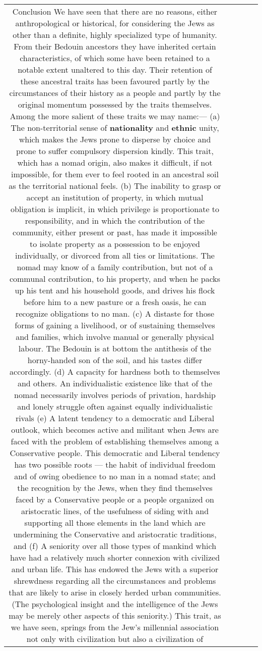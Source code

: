 \documentclass[11pt]{article}
\newlength\mylength
\begin{document}
\begin{center}
\begin{longtable}{|C{.65\mylength}|C{.30\mylength}|C{.12\mylength}|C{.12\mylength}|C{.12\mylength}|}
  \small Conclusion We have seen that there are no reasons, either anthropological or historical, for considering the Jews as other than a definite, highly specialized type of humanity. From their Bedouin ancestors they have inherited certain characteristics, of which some have been retained to a notable extent unaltered to this day. Their retention of these ancestral traits has been favoured partly by the circumstances of their history as a people and partly by the original momentum possessed by the traits themselves. Among the more salient of these traits we may name:—    (a) The non-territorial sense of \textbf{nationality} and \textbf{ethnic} unity, which makes the Jews prone to disperse by choice and prone to suffer compulsory dispersion kindly. This trait, which has a nomad origin, also makes it difficult, if not impossible, for them ever to feel rooted in an ancestral soil as the territorial national feels.    (b) The inability to grasp or accept an institution of property, in which mutual obligation is implicit, in which privilege is proportionate to responsibility, and in which the contribution of the community, either present or past, has made it impossible to isolate property as a possession to be enjoyed individually, or divorced from all ties or limitations. The nomad may know of a family contribution, but not of a communal contribution, to his property, and when he packs up his tent and his household goods, and drives his flock before him to a new pasture or a fresh oasis, he can recognize obligations to no man.    (c) A distaste for those forms of gaining a livelihood, or of sustaining themselves and families, which involve manual or generally physical labour. The Bedouin is at bottom the antithesis of the horny-handed son of the soil, and his tastes differ accordingly.    (d) A capacity for hardness both to themselves and others. An individualistic existence like that of the nomad necessarily involves periods of privation, hardship and lonely struggle often against equally individualistic rivals (e) A latent tendency to a democratic and Liberal outlook, which becomes active and militant when Jews are faced with the problem of establishing themselves among a Conservative people. This democratic and Liberal tendency has two possible roots — the habit of individual freedom and of owing obedience to no man in a nomad state; and the recognition by the Jews, when they find themselves faced by a Conservative people or a people organized on aristocratic lines, of the usefulness of siding with and supporting all those elements in the land which are undermining the Conservative and aristocratic traditions, and    (f) A seniority over all those types of mankind which have had a relatively much shorter connexion with civilized and urban life. This has endowed the Jews with a superior shrewdness regarding all the circumstances and problems that are likely to arise in closely herded urban communities. (The psychological insight and the intelligence of the Jews may be merely other aspects of this seniority.) This trait, as we have seen, springs from the Jew's millennial association not only with civilization but also a civilization of 
\end{longtable}
\end{center}
\end{document}
